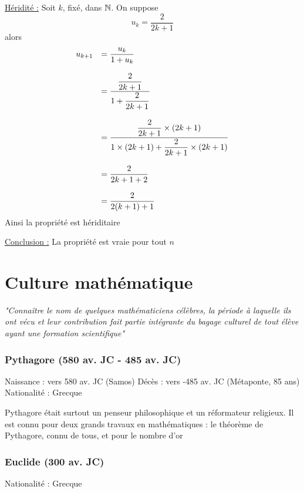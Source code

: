 \begin{exemples}
\underline{Héridité :}\newline
Soit $k$, fixé, dans $\mathbb{N}$. On suppose 
$$u_k = \dfrac{2}{2k+1}$$
alors 
$$
\begin{array}{l l}
u_{k+1} &= \dfrac{u_k}{1+u_k}\\ \\
&= \dfrac{\dfrac{2}{2k+1}}{1+\dfrac{2}{2k+1}} \\ \\
&= \dfrac{\dfrac{2}{2k+1} \times (2k+1)}{1\times(2k+1)+\dfrac{2}{2k+1}\times(2k+1)} \\ \\
& = \dfrac{2}{2k+1 + 2}\\ \\
& = \dfrac{2}{2(k+1)+1}\\
\end{array}
$$
Ainsi la propriété est hériditaire\newline

\underline{Conclusion :}\newline 
La propriété est vraie pour tout $n$\newline
\end{exemples}
\chapter{Culture mathématique}
\emph{"Connaître le nom de quelques mathématiciens célèbres, la période à laquelle ils ont vécu et leur contribution fait partie intégrante du bagage culturel de tout élève ayant une formation scientifique"}

\subsection*{Pythagore (580 av. JC - 485 av. JC)}
Naissance : vers 580 av. JC (Samos)\newline
Décès : vers -485 av. JC (Métaponte, 85 ans)\newline
Nationalité : Grecque\newline


Pythagore était surtout un penseur philosophique et un réformateur religieux. Il est connu pour deux grands travaux en mathématiques : le théorème de Pythagore, connu de tous, et pour le nombre d'or

\subsection*{Euclide (300 av. JC)}
Nationalité : Grecque\newline


